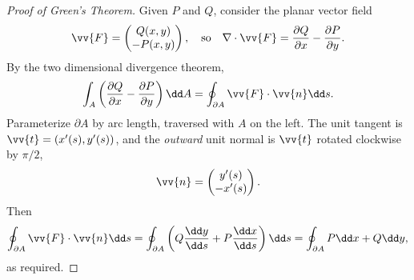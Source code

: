 \begin{proof}[Proof of Green's Theorem]
	Given $P$ and $Q$, consider the planar vector field
	$$
	\vv{F} = \begin{pmatrix}
		Q(x, y) \\ -P(x, y)
	\end{pmatrix}, \quad \text{so} \quad \nabla \cdot \vv{F} = \frac{\partial Q}{\partial x} - \frac{\partial P}{\partial y}.
	$$
	By the two dimensional divergence theorem,
	$$
	\int_A \left(\frac{\partial Q}{\partial x} - \frac{\partial P}{\partial y}\right) \dd A = \oint_{\partial A} \vv{F} \cdot \vv{n} \dd s.
	$$
	Parameterize $\partial A$ by arc length, traversed with $A$ on the left. The unit tangent is $\vv{t} = (x'(s), y'(s))$, and the \emph{outward} unit normal is $\vv{t}$ rotated clockwise by $\pi/2$,
	$$
	\vv{n} = \begin{pmatrix}
		y'(s) \\ -x'(s)
	\end{pmatrix}.
	$$
	Then
	$$
	\oint_{\partial A} \vv{F} \cdot \vv{n} \dd s = \oint_{\partial A} \left(Q \frac{\dd y}{\dd s} + P \frac{\dd x}{\dd s}\right) \dd s = \oint_{\partial A} P \dd x + Q \dd y,
	$$
	as required.
\end{proof}

